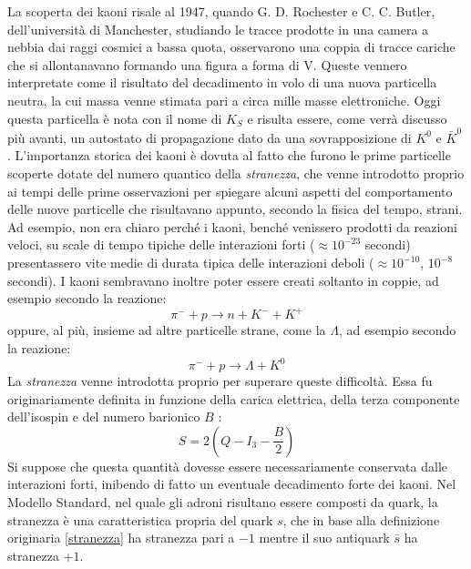 La scoperta dei kaoni risale al 1947, quando G. D. Rochester e C. C. Butler, dell'università di Manchester, studiando le tracce prodotte in una camera a nebbia dai 
raggi cosmici a bassa quota, osservarono una coppia di tracce cariche che si allontanavano formando una figura a forma di V. Queste vennero interpretate come
il risultato del decadimento in volo di una nuova particella neutra, la cui massa venne stimata pari a circa mille masse
elettroniche. Oggi questa particella è nota con il nome di $K_S$ e risulta essere, come verrà discusso più avanti, un autostato di propagazione dato 
da una sovrapposizione di $K^0$ e $\bar{K}^0$ \cite{Kabir}.
L'importanza storica dei kaoni è dovuta al fatto che furono le prime particelle scoperte dotate del numero quantico della \emph{stranezza}, che venne
introdotto proprio ai tempi delle prime osservazioni per spiegare alcuni aspetti del comportamento delle nuove particelle che risultavano appunto, secondo la fisica 
del tempo, strani. Ad esempio, non era chiaro perché i kaoni, benché venissero prodotti da reazioni veloci, su scale di tempo tipiche delle interazioni forti 
($\approx 10^{-23}$ secondi) presentassero vite medie di durata tipica delle interazioni deboli ($\approx 10^{-10}$, $10^{-8}$ secondi)\cite{Krane}.
I kaoni sembravano inoltre poter essere creati soltanto in coppie, ad esempio secondo la reazione:
\begin{equation}\label{Kaone1}
 \pi^- + p \longrightarrow n + K^- + K^+
\end{equation}
oppure, al più, insieme ad altre particelle strane, come la $\Lambda$, ad esempio secondo la reazione:
\begin{equation}\label{Kaone2}
 \pi^- + p \longrightarrow \Lambda + K^0
\end{equation}
La \emph{stranezza} venne introdotta proprio per superare queste difficoltà. Essa fu originariamente definita in funzione della carica elettrica, della terza componente 
dell'isospin e del numero barionico $B$ \cite{Kabir}:
\begin {equation}\label{stranezza}
S = 2(Q - I_3 - \frac{B}{2})
\end{equation}
Si suppose che questa quantità dovesse essere necessariamente conservata dalle interazioni forti, inibendo di fatto un eventuale decadimento forte dei kaoni.
Nel Modello Standard, nel quale gli adroni risultano essere composti da quark, la stranezza è una caratteristica propria del quark $s$, che in base alla 
definizione originaria \eqref{stranezza} ha stranezza pari a $-1$ mentre il suo antiquark $\bar{s}$ ha stranezza $+1$.

